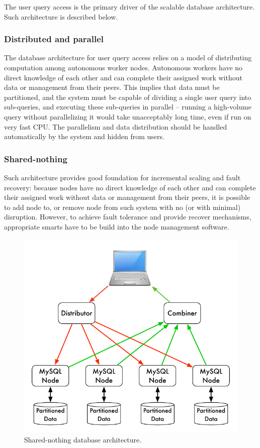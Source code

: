 \documentclass[DM,toc]{lsstdoc}
\begin{document}
The user query access is the primary driver of the scalable database
architecture. Such architecture is described below.

\subsubsection{Distributed and parallel}\label{distributed-and-parallel}

The database architecture for user query access relies on a model of
distributing computation among autonomous worker nodes. Autonomous
workers have no direct knowledge of each other and can complete their
assigned work without data or management from their peers. This implies
that data must be partitioned, and the system must be capable of
dividing a single user query into sub-queries, and executing these
sub-queries in parallel -- running a high-volume query without
parallelizing it would take unacceptably long time, even if run on very
fast CPU. The parallelism and data distribution should be handled
automatically by the system and hidden from users.

\subsubsection{Shared-nothing}\label{shared-nothing}

Such architecture provides good foundation for incremental scaling and
fault recovery: because nodes have no direct knowledge of each other and
can complete their assigned work without data or management from their
peers, it is possible to add node to, or remove node from such system
with no (or with minimal) disruption. However, to achieve fault
tolerance and provide recover mechanisms, appropriate smarts have to be
build into the node management software.

\begin{figure}[H]
\centering
\includegraphics{_static/shared_nothing_arch.pdf}
\caption{Shared-nothing database architecture.}
\end{figure}
\end{document}
